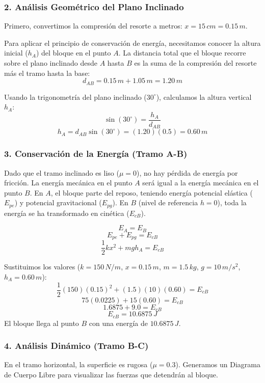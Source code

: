 \documentclass[12pt, a4paper]{article}
\begin{document}
\subsubsection*{2. Análisis Geométrico del Plano Inclinado}
Primero, convertimos la compresión del resorte a metros: $x = 15 \, \si{cm} = 0.15 \, \si{m}$.

Para aplicar el principio de conservación de energía, necesitamos conocer la altura inicial ($h_A$) del bloque en el punto $A$. La distancia total que el bloque recorre sobre el plano inclinado desde $A$ hasta $B$ es la suma de la compresión del resorte más el tramo hasta la base:
$$ d_{AB} = 0.15 \, \si{m} + 1.05 \, \si{m} = 1.20 \, \si{m} $$

Usando la trigonometría del plano inclinado ($30^\circ$), calculamos la altura vertical $h_A$:
$$ \sin(30^\circ) = \frac{h_A}{d_{AB}} $$
$$ h_A = d_{AB} \sin(30^\circ) = (1.20)(0.5) = 0.60 \, \si{m} $$

\subsubsection*{3. Conservación de la Energía (Tramo A-B)}
Dado que el tramo inclinado es liso ($\mu = 0$), no hay pérdida de energía por fricción. La energía mecánica en el punto $A$ será igual a la energía mecánica en el punto $B$. En $A$, el bloque parte del reposo, teniendo energía potencial elástica ($E_{pe}$) y potencial gravitacional ($E_{pg}$). En $B$ (nivel de referencia $h=0$), toda la energía se ha transformado en cinética ($E_{cB}$).

$$ E_A = E_B $$
$$ E_{pe} + E_{pg} = E_{cB} $$
$$ \frac{1}{2} k x^2 + m g h_A = E_{cB} $$

Sustituimos los valores ($k = 150 \, \si{N/m}$, $x = 0.15 \, \si{m}$, $m = 1.5 \, \si{kg}$, $g = 10 \, \si{m/s^2}$, $h_A = 0.60 \, \si{m}$):
$$ \frac{1}{2} (150) (0.15)^2 + (1.5)(10)(0.60) = E_{cB} $$
$$ 75 (0.0225) + 15 (0.60) = E_{cB} $$
$$ 1.6875 + 9.0 = E_{cB} $$
$$ E_{cB} = 10.6875 \, \si{J} $$
El bloque llega al punto $B$ con una energía de $10.6875 \, \si{J}$.

\subsubsection*{4. Análisis Dinámico (Tramo B-C)}
En el tramo horizontal, la superficie es rugosa ($\mu = 0.3$). Generamos un Diagrama de Cuerpo Libre para visualizar las fuerzas que detendrán al bloque.
\end{document}
